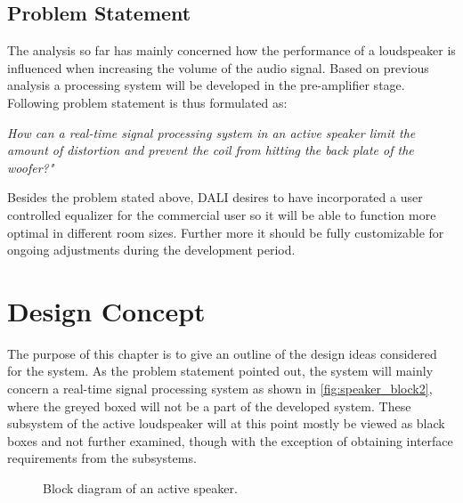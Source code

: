 %

%

%

\section{Problem Statement} \label{sec:problem_statement}
The analysis so far has mainly concerned how the performance of a loudspeaker is influenced when increasing the volume of the audio signal. Based on previous analysis a processing system will be developed in the pre-amplifier stage. Following problem statement is thus formulated as:

\begin{center}
\label{ProblemStatement}
\textit{How can a real-time signal processing system in an active speaker limit the amount of distortion and prevent the coil from hitting the back plate of the woofer?"}
\end{center}
Besides the problem stated above, DALI desires to have incorporated a user controlled equalizer for the commercial user so it will be able to function more optimal in different room sizes. Further more it should be fully customizable for ongoing adjustments during the development period.


\chapter{Design Concept}
The purpose of this chapter is to give an outline of the design ideas considered for the system. As the problem statement pointed out, the system will mainly concern a real-time signal processing system as shown in \autoref{fig:speaker_block2}, where the greyed boxed will not be a part of the developed system. These subsystem of the active loudspeaker will at this point mostly be viewed as black boxes and not further examined, though with the exception of obtaining interface requirements from the subsystems.

\begin{figure}[H]
\centering
{}
\scalebox{0.9}{
}
\caption{Block diagram of an active speaker.}
\label{fig:speaker_block2}
\end{figure}

